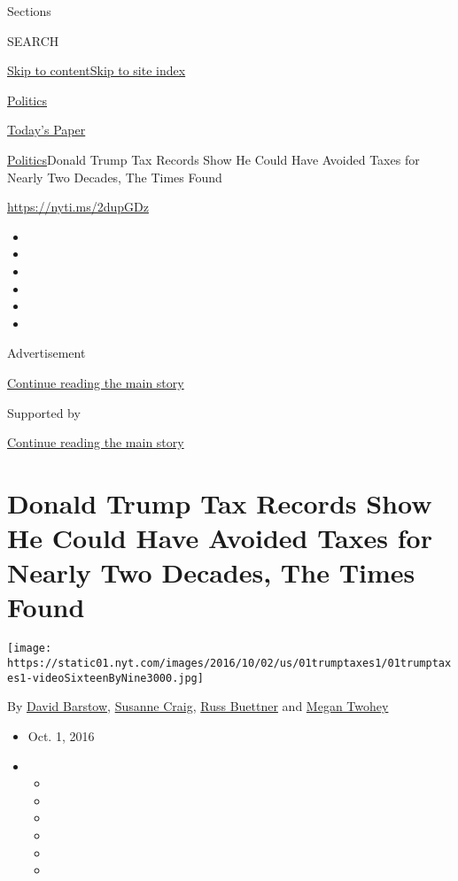 Sections

SEARCH

\protect\hyperlink{site-content}{Skip to
content}\protect\hyperlink{site-index}{Skip to site index}

\href{https://www.nytimes.com/section/politics}{Politics}

\href{https://myaccount.nytimes.com/auth/login?response_type=cookie\&client_id=vi}{}

\href{https://www.nytimes.com/section/todayspaper}{Today's Paper}

\href{/section/politics}{Politics}\textbar{}Donald Trump Tax Records
Show He Could Have Avoided Taxes for Nearly Two Decades, The Times Found

\url{https://nyti.ms/2dupGDz}

\begin{itemize}
\item
\item
\item
\item
\item
\item
\end{itemize}

Advertisement

\protect\hyperlink{after-top}{Continue reading the main story}

Supported by

\protect\hyperlink{after-sponsor}{Continue reading the main story}

\hypertarget{donald-trump-tax-records-show-he-could-have-avoided-taxes-for-nearly-two-decades-the-times-found}{%
\section{Donald Trump Tax Records Show He Could Have Avoided Taxes for
Nearly Two Decades, The Times
Found}\label{donald-trump-tax-records-show-he-could-have-avoided-taxes-for-nearly-two-decades-the-times-found}}

\texttt{[image: https://static01.nyt.com/images/2016/10/02/us/01trumptaxes1/01trumptaxes1-videoSixteenByNine3000.jpg]}

By \href{https://www.nytimes.com/by/david-barstow}{David Barstow},
\href{https://www.nytimes.com/by/susanne-craig}{Susanne Craig},
\href{https://www.nytimes.com/by/russ-buettner}{Russ Buettner} and
\href{https://www.nytimes.com/by/megan-twohey}{Megan Twohey}

\begin{itemize}
\item
  Oct. 1, 2016
\item
  \begin{itemize}
  \item
  \item
  \item
  \item
  \item
  \item
  \end{itemize}
\end{itemize}

